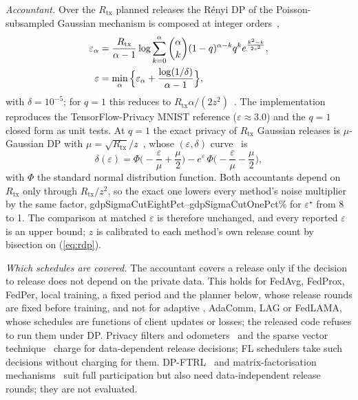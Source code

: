 \emph{Accountant.} Over the $R_{\mathrm{tx}}$ planned releases the R\'enyi DP of the Poisson-subsampled Gaussian mechanism is composed at integer orders~\cite{mironov2019sgm},
\begin{align}
\varepsilon_\alpha&=\frac{R_{\mathrm{tx}}}{\alpha-1}\log\sum_{k=0}^{\alpha}\binom{\alpha}{k}(1-q)^{\alpha-k}q^ke^{\frac{k^2-k}{2z^2}},\notag\\
\varepsilon&=\min_\alpha\Big\{\varepsilon_\alpha+\frac{\log(1/\delta)}{\alpha-1}\Big\},
\label{eq:rdp}
\end{align}
with $\delta=10^{-5}$; for $q=1$ this reduces to $R_{\mathrm{tx}}\alpha/(2z^2)$~\cite{mironov2017}. The implementation reproduces the TensorFlow-Privacy MNIST reference ($\varepsilon\approx3.0$) and the $q=1$ closed form as unit tests. At $q=1$ the exact privacy of $R_{\mathrm{tx}}$ Gaussian releases is $\mu$-Gaussian DP with $\mu=\sqrt{R_{\mathrm{tx}}}/z$~\cite{dong2022gdp}, whose $(\varepsilon,\delta)$ curve~\cite{balle2018} is
\begin{equation}
\delta(\varepsilon)=\Phi\Big(-\frac{\varepsilon}{\mu}+\frac{\mu}{2}\Big)-e^{\varepsilon}\,\Phi\Big(-\frac{\varepsilon}{\mu}-\frac{\mu}{2}\Big),
\label{eq:gdp}
\end{equation}
with $\Phi$ the standard normal distribution function. Both accountants depend on $R_{\mathrm{tx}}$ only through $R_{\mathrm{tx}}/z^2$, so the exact one lowers every method's noise multiplier by the same factor, \num{gdpSigmaCutEightPct}--\num{gdpSigmaCutOnePct}\% for $\varepsilon^\star$ from 8 to 1. The comparison at matched $\varepsilon$ is therefore unchanged, and every reported $\varepsilon$ is an upper bound; $z$ is calibrated to each method's own release count by bisection on (\ref{eq:rdp}).

\emph{Which schedules are covered.} The accountant covers a release only if the decision to release does not depend on the private data. This holds for FedAvg, FedProx, FedPer, local training, a fixed period and the planner below, whose release rounds are fixed before training, and not for adaptive \tierfed{}, AdaComm, LAG or FedLAMA, whose schedules are functions of client updates or losses; the released code refuses to run them under DP. Privacy filters and odometers~\cite{rogers2016odometer} and the sparse vector technique~\cite{lyu2017svt} charge for data-dependent release decisions; FL schedulers take such decisions without charging for them. DP-FTRL~\cite{kairouz2021ftrl} and matrix-factorisation mechanisms~\cite{choquette2023banded} suit full participation but also need data-independent release rounds; they are not evaluated.

